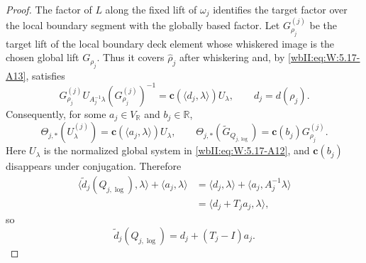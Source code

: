 \begin{proof}
The factor of \(L\) along the fixed lift of \(\omega_j\) identifies the
target factor over the local boundary segment with the globally based
factor.  Let \(G_{\rho_j}^{(j)}\) be the target lift of the local boundary
deck element whose whiskered image is the chosen global lift
\(G_{\rho_j}\).  Thus it covers \(\widehat\rho_j\) after whiskering and,
by \eqref{wbII:eq:W:5.17-A13}, satisfies
\[
 G_{\rho_j}^{(j)}U_{A_j^{-1}\lambda}(G_{\rho_j}^{(j)})^{-1}
 =\mathbf c(\langle d_j,\lambda\rangle)U_\lambda,
 \qquad d_j=d(\rho_j).
\]
Consequently, for some
\(a_j\in V_{\mathbb R}\) and \(b_j\in\mathbb R\),
\[
 \Theta_{j,*}(U_\lambda^{(j)})
 =\mathbf c(\langle a_j,\lambda\rangle)U_\lambda,
 \qquad
 \Theta_{j,*}(\widetilde G_{Q_{j,\log}})
 =\mathbf c(b_j)G_{\rho_j}^{(j)}.
\]
Here \(U_\lambda\) is the normalized global system in \eqref{wbII:eq:W:5.17-A12}, and
\(\mathbf c(b_j)\) disappears under conjugation.
Therefore
\[
\begin{aligned}
 \langle\widetilde d_j(Q_{j,\log}),\lambda\rangle
 +\langle a_j,\lambda\rangle
 &=\langle d_j,\lambda\rangle
   +\langle a_j,A_j^{-1}\lambda\rangle\\
 &=\langle d_j+T_ja_j,\lambda\rangle,
\end{aligned}
\]
so
\[
 \widetilde d_j(Q_{j,\log})=d_j+(T_j-I)a_j.
\tag{W.110}\label{wbII:eq:W:5.17-A14e}
\]


\end{proof}
